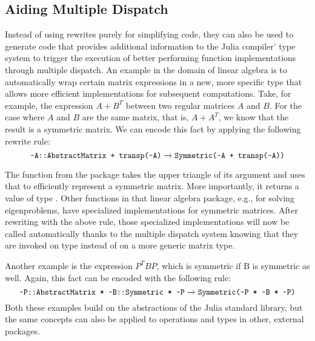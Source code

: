 \subsection{Aiding Multiple Dispatch}
Instead of using rewrites purely for simplifying code, they can also be used to generate code that provides additional information to the Julia compiler' type system to trigger the execution of better performing function implementations through multiple dispatch. 
An example in the domain of linear algebra is to automatically wrap certain matrix expressions in a new, more specific type that allows more efficient implementations for subsequent computations.
Take, for example, the expression $A + B^T$ between two regular matrices $A$ and $B$.
For the case where $A$ and $B$ are the same matrix, that is, $A+A^T$, we know that the result is a symmetric matrix.
We can encode this fact by applying the following rewrite rule:
$$ 
\code{\char`\~A::AbstractMatrix + transp(\char`\~A)} \rightarrow\code{Symmetric(\char`\~A + transp(\char`\~A))}
$$

The  function from the  package takes the upper triangle of its argument and uses that to efficiently represent a symmetric matrix. 
More importantly, it returns a value of type . Other functions in that linear algebra package, e.g., for solving eigenproblems, have specialized implementations for symmetric matrices. After rewriting with the above rule, those specialized implementations will now be called automatically thanks to the multiple dispatch system knowing that they are invoked on type  instead of on a more generic matrix type. 

Another example is the expression $P^T B P$, which is symmetric if B is symmetric as well.
Again, this fact can be encoded with the following rule:
$$ 
\code{\char`\~P::AbstractMatrix * \char`\~B::Symmetric * \char`\~P} \rightarrow\code{Symmetric(\char`\~P * \char`\~B * \char`\~P)}
$$
Both these examples build on the abstractions of the Julia standard library, but the same concepts can also be applied to operations and types in other, external packages.

